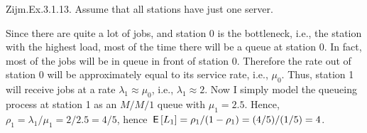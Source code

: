 \begin{exercise}
Zijm.Ex.3.1.13. Assume that all stations have just one server.
\begin{solution}
  Since there are quite a lot of jobs, and station 0 is the bottleneck, i.e., the station with the highest load, most of the time there will be a queue at station 0.
  In fact, most of the jobs will be in queue in front of station 0.
  Therefore the rate out of station 0 will be approximately equal to its service rate, i.e., $\mu_0$.
  Thus, station 1 will receive jobs at a rate $\lambda_1\approx\mu_0$, i.e., $\lambda_1 \approx 2$.
  Now I simply model the queueing process at station 1 as an $M/M/1$ queue with $\mu_1=2.5$.
  Hence, $\rho_1 = \lambda_1/\mu_1=2/2.5 = 4/5$, hence $\,\mathsf{E}\left[L_1\right] = \rho_1/(1-\rho_1) = (4/5)/(1/5) = 4$.
\end{solution}
\end{exercise}



